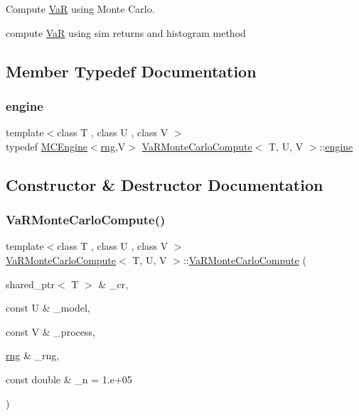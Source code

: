 Compute \hyperlink{classVaR}{VaR} using Monte Carlo. 

compute \hyperlink{classVaR}{VaR} using sim returns and histogram method 

\subsection{Member Typedef Documentation}
\hypertarget{classVaRMonteCarloCompute_a7ab31736fcc0c8c0630232d522186250}{}\label{classVaRMonteCarloCompute_a7ab31736fcc0c8c0630232d522186250} 
\subsubsection{\texorpdfstring{engine}{engine}}
{\footnotesize\ttfamily template$<$class T , class U , class V $>$ \\
typedef \hyperlink{classMCEngine}{M\+C\+Engine}$<$\hyperlink{classrng}{rng},V$>$ \hyperlink{classVaRMonteCarloCompute}{Va\+R\+Monte\+Carlo\+Compute}$<$ T, U, V $>$\+::\hyperlink{classVaRMonteCarloCompute_a7ab31736fcc0c8c0630232d522186250}{engine}}



\subsection{Constructor \& Destructor Documentation}
\hypertarget{classVaRMonteCarloCompute_a2362734a7d6eb5530984ace252361a6a}{}\label{classVaRMonteCarloCompute_a2362734a7d6eb5530984ace252361a6a} 
\subsubsection{\texorpdfstring{Va\+R\+Monte\+Carlo\+Compute()}{VaRMonteCarloCompute()}}
{\footnotesize\ttfamily template$<$class T , class U , class V $>$ \\
\hyperlink{classVaRMonteCarloCompute}{Va\+R\+Monte\+Carlo\+Compute}$<$ T, U, V $>$\+::\hyperlink{classVaRMonteCarloCompute}{Va\+R\+Monte\+Carlo\+Compute} (\begin{DoxyParamCaption}\item[{shared\+\_\+ptr$<$ T $>$ \&}]{\+\_\+cr,  }\item[{const U \&}]{\+\_\+model,  }\item[{const V \&}]{\+\_\+process,  }\item[{\hyperlink{classrng}{rng} \&}]{\+\_\+rng,  }\item[{const double \&}]{\+\_\+n = {\ttfamily 1.e+05} }\end{DoxyParamCaption})\hspace{0.3cm}{\ttfamily [inline]}}

